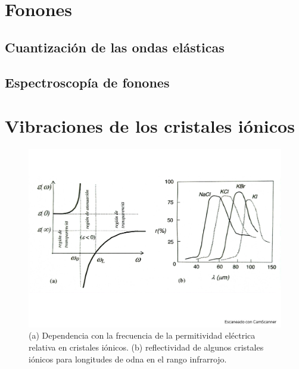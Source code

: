 \section{Fonones}

\subsection{Cuantización de las ondas elásticas}

\subsection{Espectroscopía de fonones}


\section{Vibraciones de los cristales iónicos}
\begin{figure}[h!] \centering
    \includegraphics[scale=0.5]{Cuerpo/Ch_04/Fotos libro 8.pdf}
    \caption{(a) Dependencia con la frecuencia de la permitividad eléctrica relativa en cristales iónicos. (b) reflectividad de algunos cristales iónicos para longitudes de odna en el rango infrarrojo.}
    \label{Fig:04-08}
\end{figure}    
